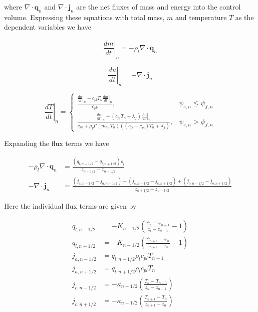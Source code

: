 \documentclass[10pt,a4paper]{article}
\begin{document}
where $\nabla\cdot \mathbf{q}_n$ and $\nabla \cdot \mathbf{j}_n$ are the net fluxes of mass and energy into the control volume. Expressing these equations with total mass, $m$ and temperature $T$ as the dependent variables we have 

\begin{equation} 
\left . \frac{dm}{dt} \right |_n
=-\rho_l \nabla \cdot \mathbf{q}_n
\end{equation}

\begin{equation} 
\left . \frac{du}{dt} \right |_n
=-\nabla \cdot \mathbf{j}_n
\end{equation}


\begin{equation} 
\left . \frac{dT}{dt} \right |_n
=
\left \{
	\begin{array}{ll}
\displaystyle
\frac{\left . \frac{du}{dt} \right |_n
-c_{pl}T_n
\left . \frac{dm}{dt} \right |_n
}{c_{pb}
}
,
&\displaystyle  \psi_{e,n} \leq \psi_{f,n}
\\[1.0em]
\displaystyle
\frac{\left . \frac{du}{dt} \right |_n
-(c_{pi}T_n-\lambda_f)
\left . \frac{dm}{dt} \right |_n
}{c_{pb}
+\rho_l f'(m_n,T_n)
((c_{pl}-c_{pi})T_n+\lambda_f)
}
,
&\displaystyle \psi_{e,n} > \psi_{f,n}
	\end{array}
\right .
\end{equation}

Expanding the flux terms we have

\begin{equation} \label{eq: massAndEnergy}
	\begin{array}{rl}
\displaystyle 
-\rho_l\nabla\cdot \mathbf{q}_n
&
		\displaystyle
=\frac{(q_{l,n-1/2}-q_{l,n+1/2})\rho_l}{z_{n+1/2}-z_{n-1/2}}
\\[1.0em]
\displaystyle 
-\nabla \cdot \mathbf{j}_n
&
		\displaystyle
=\frac{(j_{a,n-1/2}-j_{a,n+1/2})
+(j_{c,n-1/2}-j_{c,n+1/2})
+(j_{o,n-1/2}-j_{o,n+1/2})
}{z_{n+1/2}-z_{n-1/2}}
	\end{array}
\end{equation}

Here the individual flux terms are given by

\begin{equation}
\begin{array}{rl}
	\displaystyle
q_{l,n-1/2}&\displaystyle =-K_{n-1/2}\left(\frac{\psi_n-\psi_{n-1}}{z_i-z_{n-1}}-1\right)
\\[0.8em]
	\displaystyle
q_{l,n+1/2}&\displaystyle =-K_{n+1/2}\left(\frac{\psi_{n+1}-\psi_{n}}{z_{n+1}-z_{n}}-1\right)
\\[0.8em]
	\displaystyle
j_{a,n-1/2}&\displaystyle =q_{l,n-1/2}\rho_l c_{pl} T_{n-1}
\\[0.8em]
	\displaystyle
j_{a,n+1/2}&\displaystyle =q_{l,n+1/2}\rho_l c_{pl} T_{n}
\\[0.8em]
	\displaystyle
j_{c,n-1/2}&\displaystyle =-\kappa_{n-1/2}\left(\frac{T_n-T_{n-1}}{z_n-z_{n-1}}\right)
\\[0.8em]
	\displaystyle
j_{c,n+1/2}&\displaystyle =-\kappa_{n+1/2}\left(\frac{T_{n+1}-T_{n}}{z_{n+1}-z_{n}}\right)
\end{array}
\end{equation}
\end{document}
